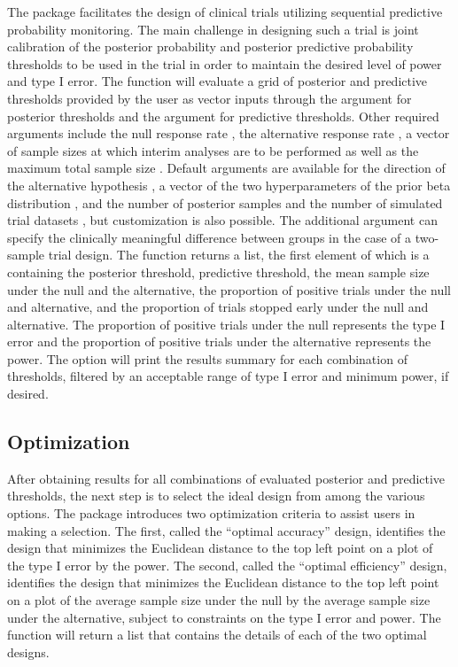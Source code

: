 The  package facilitates the design of clinical trials
utilizing sequential predictive probability monitoring. The main
challenge in designing such a trial is joint calibration of the
posterior probability and posterior predictive probability thresholds to
be used in the trial in order to maintain the desired level of power and
type I error. The  function will evaluate
a grid of posterior and predictive thresholds provided by the user as
vector inputs through the argument  for posterior
thresholds and the argument  for predictive
thresholds. Other required arguments include the null response rate
, the alternative response rate , a vector of
sample sizes at which interim analyses are to be performed  as
well as the maximum total sample size . Default arguments are
available for the direction of the alternative hypothesis
, a vector of the two hyperparameters of the prior beta
distribution , and the number of posterior samples 
and the number of simulated trial datasets , but
customization is also possible. The additional argument  can
specify the clinically meaningful difference between groups in the case
of a two-sample trial design. The function returns a list, the first
element of which is a  containing the posterior threshold,
predictive threshold, the mean sample size under the null and the
alternative, the proportion of positive trials under the null and
alternative, and the proportion of trials stopped early under the null
and alternative. The proportion of positive trials under the null
represents the type I error and the proportion of positive trials under
the alternative represents the power. The  option will
print the results summary for each combination of thresholds, filtered
by an acceptable range of type I error and minimum power, if desired.

\hypertarget{optimization}{%
\subsection{Optimization}\label{optimization}}

After obtaining results for all combinations of evaluated posterior and
predictive thresholds, the next step is to select the ideal design from
among the various options. The  package introduces two
optimization criteria to assist users in making a selection. The first,
called the ``optimal accuracy'' design, identifies the design that
minimizes the Euclidean distance to the top left point on a plot of the
type I error by the power. The second, called the ``optimal efficiency''
design, identifies the design that minimizes the Euclidean distance to
the top left point on a plot of the average sample size under the null
by the average sample size under the alternative, subject to constraints
on the type I error and power. The  function
will return a list that contains the details of each of the two optimal
designs.

